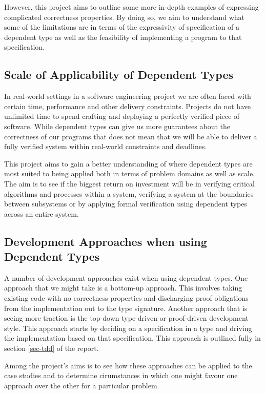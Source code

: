 \documentclass[a4paper, notitlepage]{report}
\begin{document}
However, this project aims to outline some more in-depth examples of expressing
complicated correctness properties. By doing so, we aim to understand what some
of the limitations are in terms of the expressivity of specification of a
dependent type as well as the feasibility of implementing a program to that
specification.

\subsection{Scale of Applicability of Dependent Types}
\label{sec:orgfcf47e7}
In real-world settings in a software engineering project we are often faced with
certain time, performance and other delivery constraints. Projects do not have
unlimited time to spend crafting and deploying a perfectly verified piece of
software. While dependent types can give us more guarantees about the
correctness of our programs that does not mean that we will be able to deliver a
fully verified system within real-world constraints and deadlines.

This project aims to gain a better understanding of where dependent types are
most suited to being applied both in terms of problem domains as well as scale.
The aim is to see if the biggest return on investment will be in verifying
critical algorithms and processes within a system, verifying a system at the
boundaries between subsystems or by applying formal verification using dependent
types across an entire system.

\subsection{Development Approaches when using Dependent Types}
\label{sec:orgd5802f1}
A number of development approaches exist when using dependent types. One
approach that we might take is a bottom-up approach. This involves taking
existing code with no correctness properties and discharging proof obligations
from the implementation out to the type signature. Another approach that is
seeing more traction is the top-down type-driven or proof-driven development
style. This approach starts by deciding on a specification in a type and driving
the implementation based on that specification. This approach is outlined fully
in section \ref{sec-tdd} of the report.

Among the project's aims is to see how these approaches can be applied to the
case studies and to determine cirumstances in which one might favour one
approach over the other for a particular problem.
\end{document}
